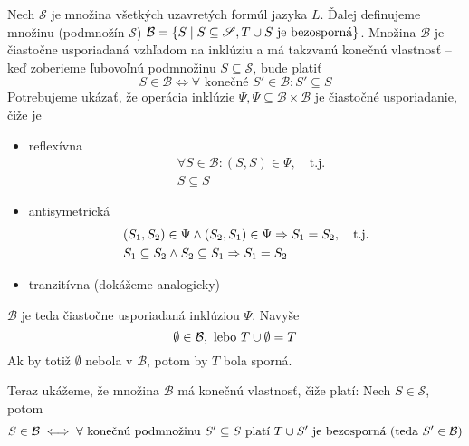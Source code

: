 \begin{dokaz}
    Nech $\mathscr{S}$ je množina všetkých uzavretých formúl jazyka $L$.
    Ďalej definujeme množinu (podmnožín $\mathscr{S}$)
    $\mathcal{B} = \{ S \mid S \subseteq \mathscr{S}, T \cup S
        \mbox{ je bezosporná}\}$.
    Množina $\mathcal{B}$ je čiastočne usporiadaná vzhľadom na
    inklúziu a má 
    takzvanú konečnú vlastnosť -- keď zoberieme ľubovoľnú podmnožinu
    $S \subseteq \mathscr{S}$, bude platiť
    \begin{equation*}
        S \in \mathcal{B} \iff \forall \mbox{ konečné } S' \in
        \mathcal{B}: S' \subseteq S
    \end{equation*}
     Potrebujeme ukázať, že operácia inklúzie $\Psi, \Psi \subseteq
     \mathcal{B}\times\mathcal{B}$ je čiastočné usporiadanie, čiže je
    \begin{itemize}
        \item reflexívna
            \begin{align*}
                &\forall S \in \mathcal{B}: (S,S) \in \Psi,
                \quad \mbox{t.j.} \\
                &S \subseteq S
            \end{align*}
        \item antisymetrická
            \begin{align*}
                &(S_1,S_2) \in \Psi \land (S_2,S_1) \in \Psi
                    \Rightarrow S_1 = S_2, \quad \mbox{t.j.} \\
                &S_1 \subseteq S_2 \land S_2 \subseteq S_1 \Rightarrow S_1 = S_2
            \end{align*}
        \item tranzitívna (dokážeme analogicky)
    \end{itemize}
    $\mathcal{B}$ je teda čiastočne usporiadaná inklúziou $\Psi$.
    Navyše
    \begin{equation*}
        \emptyset \in \mathcal{B}, \mbox{ lebo } T \cup \emptyset = T
    \end{equation*}
    Ak by totiž $\emptyset$ nebola v $\mathcal{B}$, potom by $T$ bola sporná.

    \noindent
    Teraz ukážeme, že množina $\mathcal{B}$ má konečnú vlastnosť, čiže
    platí: Nech $S \in \mathscr{S}$, potom
    \begin{equation*}
            S \in \mathcal{B} \iff \forall \textrm{
        konečnú podmnožinu }S' \subseteq S \textrm{ platí } T \cup S' 
            \textrm{ je bezosporná (teda }S' \in \mathcal{B})
    \end{equation*}
   

\end{dokaz}
